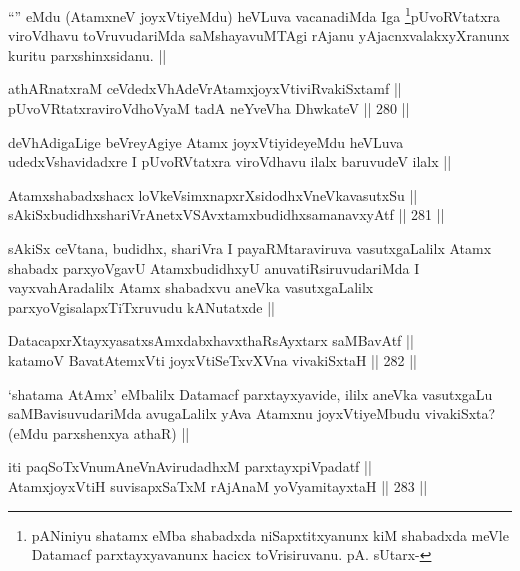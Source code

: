 \begin{artha}
``\stext'' eMdu (AtamxneV joyxVtiyeMdu) heVLuva vacanadiMda Iga \footnote{pANiniyu shatamx eMba shabadxda niSapxtitxyanunx kiM shabadxda meVle Datamacf parxtayxyavanunx hacicx toVrisiruvanu. pA. sUtarx-}pUvoRVtatxra viroVdhavu toVruvudariMda saMshayavuMTAgi rAjanu yAjacnxvalakxyXranunx kuritu parxshinxsidanu. || 
\end{artha}

\begin{shl}
athARnatxraM ceVdedxVhAdeVrAtamxjoyxVtiviRvakiSxtamf || \\
pUvoVRtatxraviroVdhoV\s yaM tadA neYveVha DhwkateV ||  280 ||  
\end{shl}

\begin{artha}
deVhAdigaLige beVreyAgiye Atamx joyxVtiyideyeMdu heVLuva udedxVshavidadxre I pUvoRVtatxra viroVdhavu ilalx baruvudeV ilalx ||
\end{artha}

\begin{shl}
Atamxshabadxshacx loVkeV\s simxnapxrXsidodhxV\s neVkavasutxSu || \\
sAkiSxbudidhxshariVrAnetxVSAvxtamxbudidhxsamanavxyAtf ||  281 ||  
\end{shl}

\begin{artha}
sAkiSx ceVtana, budidhx, shariVra I payaRMtaraviruva vasutxgaLalilx Atamx shabadx parxyoVgavU AtamxbudidhxyU anuvatiRsiruvudariMda I vayxvahAradalilx Atamx shabadxvu aneVka vasutxgaLalilx parxyoVgisalapxTiTxruvudu kANutatxde ||
\end{artha}

\begin{shl}
DatacapxrXtayxyasatxsAmxdabxhavxthaRsAyxtarx saMBavAtf || \\
katamoV BavatA\s \s temxVti joyxVtiSeTxvXVna vivakiSxtaH ||  282 || 
\end{shl}

\begin{artha}
`shatama AtAmx' eMbalilx Datamacf parxtayxyavide, ililx aneVka vasutxgaLu saMBavisuvudariMda avugaLalilx yAva Atamxnu joyxVtiyeMbudu vivakiSxta? (eMdu parxshenxya athaR) ||
\end{artha}

\begin{shl}
iti paqSoTxV\s numAneVnAvirudadhxM parxtayxpiVpadatf || \\
AtamxjoyxVtiH suvisapxSaTxM rAjAnaM yoV\s yamitayxtaH ||  283 || 
\end{shl}

